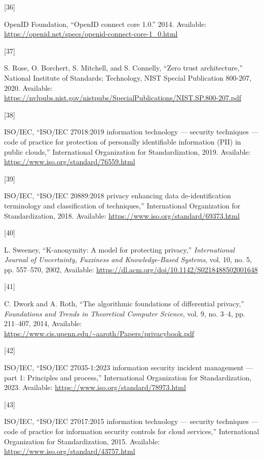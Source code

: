 \documentclass[
  a4paper,
  a4paper,
  11pt]{ltjsbook}
\newlength{\cslhangindent}
\newlength{\csllabelwidth}
\newenvironment{CSLReferences}[2] %
 {\begin{list}{}{%
  \setlength{\itemindent}{0pt}
  \setlength{\leftmargin}{0pt}
  \setlength{\parsep}{0pt}
  \ifodd #1
   \setlength{\leftmargin}{\cslhangindent}
   \setlength{\itemindent}{-1\cslhangindent}
  \fi
  \setlength{\itemsep}{#2\baselineskip}}}
 {\end{list}}
\newcommand{\CSLLeftMargin}[1]{\parbox[t]{\csllabelwidth}{\strut#1\strut}}
\newcommand{\CSLRightInline}[1]{\parbox[t]{\linewidth - \csllabelwidth}{\strut#1\strut}}
\begin{document}
\begin{CSLReferences}{0}{0}
\CSLLeftMargin{{[}36{]} }%
\CSLRightInline{OpenID Foundation, {``OpenID connect core 1.0.''} 2014.
Available: \url{https://openid.net/specs/openid-connect-core-1_0.html}}

\CSLLeftMargin{{[}37{]} }%
\CSLRightInline{S. Rose, O. Borchert, S. Mitchell, and S. Connelly,
{``Zero trust architecture,''} National Institute of Standards;
Technology, NIST Special Publication 800-207, 2020. Available:
\url{https://nvlpubs.nist.gov/nistpubs/SpecialPublications/NIST.SP.800-207.pdf}}

\CSLLeftMargin{{[}38{]} }%
\CSLRightInline{ISO/IEC, {``ISO/IEC 27018:2019 information technology
--- security techniques --- code of practice for protection of
personally identifiable information (PII) in public clouds,''}
International Organization for Standardization, 2019. Available:
\url{https://www.iso.org/standard/76559.html}}

\CSLLeftMargin{{[}39{]} }%
\CSLRightInline{ISO/IEC, {``ISO/IEC 20889:2018 privacy enhancing data
de-identification terminology and classification of techniques,''}
International Organization for Standardization, 2018. Available:
\url{https://www.iso.org/standard/69373.html}}

\CSLLeftMargin{{[}40{]} }%
\CSLRightInline{L. Sweeney, {``K-anonymity: A model for protecting
privacy,''} \emph{International Journal of Uncertainty, Fuzziness and
Knowledge-Based Systems}, vol. 10, no. 5, pp. 557--570, 2002, Available:
\url{https://dl.acm.org/doi/10.1142/S0218488502001648}}

\CSLLeftMargin{{[}41{]} }%
\CSLRightInline{C. Dwork and A. Roth, {``The algorithmic foundations of
differential privacy,''} \emph{Foundations and Trends in Theoretical
Computer Science}, vol. 9, no. 3--4, pp. 211--407, 2014, Available:
\url{https://www.cis.upenn.edu/~aaroth/Papers/privacybook.pdf}}

\CSLLeftMargin{{[}42{]} }%
\CSLRightInline{ISO/IEC, {``ISO/IEC 27035-1:2023 information security
incident management --- part 1: Principles and process,''} International
Organization for Standardization, 2023. Available:
\url{https://www.iso.org/standard/78973.html}}

\CSLLeftMargin{{[}43{]} }%
\CSLRightInline{ISO/IEC, {``ISO/IEC 27017:2015 information technology
--- security techniques --- code of practice for information security
controls for cloud services,''} International Organization for
Standardization, 2015. Available:
\url{https://www.iso.org/standard/43757.html}}


\end{CSLReferences}
\end{document}
